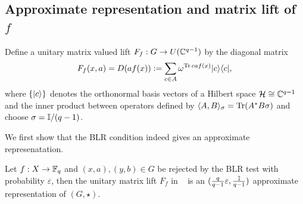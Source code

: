 \subsection{Approximate representation and matrix lift of $f$}\label{sec:rep}

\begin{definition}\label{def:Flift}\leanok
Define a unitary matrix valued lift $F_f : G \to U(\mathbb{C}^{q-1})$ by the diagonal matrix
\begin{equation}\label{eq:Flift-def}
F_f(x, a) = D(a f(x)) := \sum_{c \in A} \omega^{{\rm Tr}\, c a f(x)}\mbox{$ | c \rangle $}\mbox{$ \langle c | $},
\end{equation}
where $\{\mbox{$ | c \rangle $}\}$ denotes the orthonormal basis vectors of a Hilbert space $\mathcal{H} \cong \mathbb{C}^{q-1}$ and the inner product between operators defined by $\langle A, B \rangle_\sigma={\rm Tr}(A^* B \sigma)$ and choose $\sigma = \mathbb{I}/(q-1)$.
\end{definition}

We first show that the BLR condition indeed gives an approximate represenatation.

\begin{lemma}\label{lem:rep-iff-blr}\leanok
Let $f : X \to \mathbb{F}_q$ and $(x, a), (y, b) \in G$ be rejected by the BLR test with probability $\varepsilon$,
then the unitary matrix lift $F_f$ in ~ is an $(\frac{q}{q-1}\varepsilon, \frac{\mathbb{I}}{q-1})$ approximate representation of $(G, \star)$.
\end{lemma}

